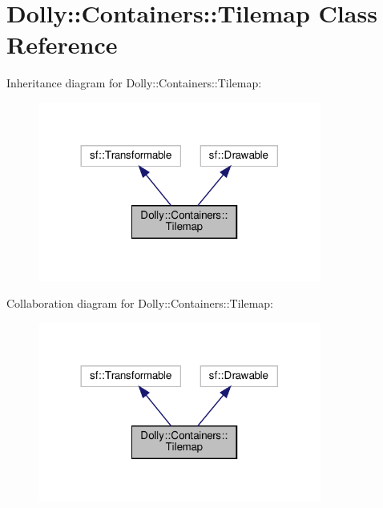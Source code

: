 \hypertarget{class_dolly_1_1_containers_1_1_tilemap}{}\section{Dolly\+:\+:Containers\+:\+:Tilemap Class Reference}
\label{class_dolly_1_1_containers_1_1_tilemap}


Inheritance diagram for Dolly\+:\+:Containers\+:\+:Tilemap\+:\nopagebreak
\begin{figure}[H]
\begin{center}
\leavevmode
\includegraphics[width=264pt]{class_dolly_1_1_containers_1_1_tilemap__inherit__graph}
\end{center}
\end{figure}


Collaboration diagram for Dolly\+:\+:Containers\+:\+:Tilemap\+:\nopagebreak
\begin{figure}[H]
\begin{center}
\leavevmode
\includegraphics[width=264pt]{class_dolly_1_1_containers_1_1_tilemap__coll__graph}
\end{center}
\end{figure}
